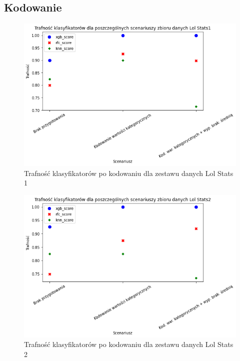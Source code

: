 \documentclass{book}
\begin{document}
\subsection{Kodowanie}


\begin{figure}[H]
\centerline{\includegraphics[scale=0.5]{Lol_Stats_1_Kodowanie}}
\centering
\caption{Trafność klasyfikatorów po kodowaniu dla zestawu danych Lol Stats 1}
\end{figure}

\begin{figure}[H]
\centerline{\includegraphics[scale=0.5]{Lol_Stats_2_Kodowanie}}
\centering
\caption{Trafność klasyfikatorów po kodowaniu dla zestawu danych Lol Stats 2}
\end{figure}
\end{document}
